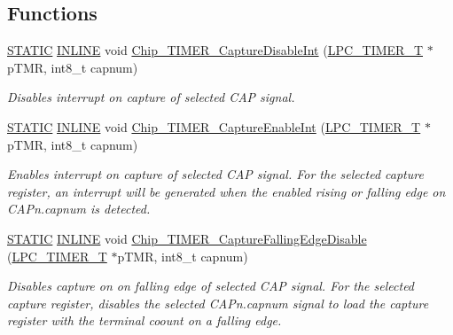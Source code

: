 \subsection*{Functions}
\begin{DoxyCompactItemize}
\item 
\hyperlink{group__LPC__Types__Public__Macros_ga10b2d890d871e1489bb02b7e70d9bdfb}{S\+T\+A\+T\+IC} \hyperlink{group__LPC__Types__Public__Types_ga2eb6f9e0395b47b8d5e3eeae4fe0c116}{I\+N\+L\+I\+NE} void \hyperlink{group__TIMER__17XX__40XX_ga75d24b5365354b481b285c7c718f3791}{Chip\+\_\+\+T\+I\+M\+E\+R\+\_\+\+Capture\+Disable\+Int} (\hyperlink{structLPC__TIMER__T}{L\+P\+C\+\_\+\+T\+I\+M\+E\+R\+\_\+T} $\ast$p\+T\+MR, int8\+\_\+t capnum)
\begin{DoxyCompactList}\small\item\em Disables interrupt on capture of selected C\+AP signal. \end{DoxyCompactList}\item 
\hyperlink{group__LPC__Types__Public__Macros_ga10b2d890d871e1489bb02b7e70d9bdfb}{S\+T\+A\+T\+IC} \hyperlink{group__LPC__Types__Public__Types_ga2eb6f9e0395b47b8d5e3eeae4fe0c116}{I\+N\+L\+I\+NE} void \hyperlink{group__TIMER__17XX__40XX_ga141861bd1b18812fcfd231b8a42065d8}{Chip\+\_\+\+T\+I\+M\+E\+R\+\_\+\+Capture\+Enable\+Int} (\hyperlink{structLPC__TIMER__T}{L\+P\+C\+\_\+\+T\+I\+M\+E\+R\+\_\+T} $\ast$p\+T\+MR, int8\+\_\+t capnum)
\begin{DoxyCompactList}\small\item\em Enables interrupt on capture of selected C\+AP signal. For the selected capture register, an interrupt will be generated when the enabled rising or falling edge on C\+A\+Pn.\+capnum is detected. \end{DoxyCompactList}\item 
\hyperlink{group__LPC__Types__Public__Macros_ga10b2d890d871e1489bb02b7e70d9bdfb}{S\+T\+A\+T\+IC} \hyperlink{group__LPC__Types__Public__Types_ga2eb6f9e0395b47b8d5e3eeae4fe0c116}{I\+N\+L\+I\+NE} void \hyperlink{group__TIMER__17XX__40XX_ga521a3308abdffb693f4785b739dae98f}{Chip\+\_\+\+T\+I\+M\+E\+R\+\_\+\+Capture\+Falling\+Edge\+Disable} (\hyperlink{structLPC__TIMER__T}{L\+P\+C\+\_\+\+T\+I\+M\+E\+R\+\_\+T} $\ast$p\+T\+MR, int8\+\_\+t capnum)
\begin{DoxyCompactList}\small\item\em Disables capture on on falling edge of selected C\+AP signal. For the selected capture register, disables the selected C\+A\+Pn.\+capnum signal to load the capture register with the terminal coount on a falling edge. \end{DoxyCompactList}\item 

\end{DoxyCompactItemize}
